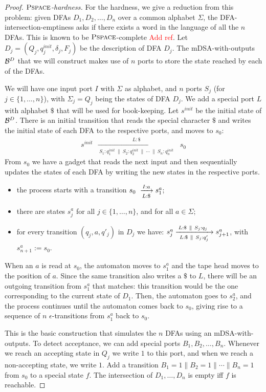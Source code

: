 \begin{proof}
    \emph{$\operatorname{\textsc{Pspace}}$-hardness.} For the hardness, we give a reduction from this problem: given DFAs $D_1, D_2, \dots, D_n$ over a common alphabet $\Sigma$, the DFA-intersection-emptiness asks if there exists a word in the language of all the $n$ DFAs. This is known to be $\operatorname{\textsc{Pspace}}$-complete \textcolor{red}{Add ref}. Let $D_j = (Q_j, q^{init}_j, \delta_j, F_j)$ be the description of DFA $D_j$. The mDSA-with-outputs $\mathcal{B}^D$ that we will construct makes use of $n$ ports to store the state reached by each of the DFAs.

    We will have one input port $I$ with $\Sigma$ as alphabet, and $n$ ports $S_j$ (for $j \in \{1, \dots, n\}$), with $\Sigma_j = Q_j$ being the states of DFA $D_j$. We add a special port $L$ with alphabet $\$$ that will be used for book-keeping. Let $s^{init}$ be the initial state of $\mathcal{B}^D$. There is an initial transition that reads the special character $\$$ and writes the initial state of each DFA to the respective ports, and moves to $s_0$:
    \begin{align*}
    s^{init}~~ \xrightarrow[~S_1: q^{init}_1 ~\parallel~ S_2: q^{init}_2 ~\parallel~ \cdots ~\parallel~ S_n: q^{init}_n~]{L: \$} ~~s_0
    \end{align*}
    From $s_0$ we have a gadget that reads the next input and then sequentially updates the states of each DFA by writing the new states in the respective ports. 
    \begin{itemize}
        \item the process starts with a transition $s_0~\xrightarrow[L:\$]{I:a} s^a_1$; 
        \item there are states $s^a_{j}$ for all $j \in \{1, \dots, n\}$, and for all $a \in \Sigma$;
        \item for every transition $(q_j, a, q'_j)$ in $D_j$ we have: $s^a_j \xrightarrow[~L:\$~\parallel~S_j: q'_j~]{L:\$ ~\parallel~ S_j: q_j~} s^a_{j+1}$, with $s^a_{n+1} := s_0$.
    \end{itemize}
    When an $a$ is read at $s_0$, the automaton moves to $s^a_1$ and the tape head moves to the position of $a$. Since the same transition also writes a $\$$ to $L$, there will be an outgoing transition from $s^a_1$ that matches: this transition would be the one corresponding to the current state of $D_1$. Then, the automaton goes to $s^a_2$, and the process continues until the automaton comes back to $s_0$, giving rise to a sequence of $n$ $\epsilon$-transitions from $s^a_1$ back to $s_0$. 

    This is the basic construction that simulates the $n$ DFAs using an mDSA-with-outputs. To detect acceptance, we can add special ports $B_1, B_2, \dots, B_n$. Whenever we reach an accepting state in $Q_j$ we write $1$ to this port, and when we reach a non-accepting state, we write $1$. Add a transition $B_1 = 1 \parallel B_2 = 1 \parallel \cdots \parallel B_n = 1$ from $s_0$ to a special state $f$. The intersection of $D_1, \dots, D_n$ is empty iff $f$ is reachable.


\end{proof}
